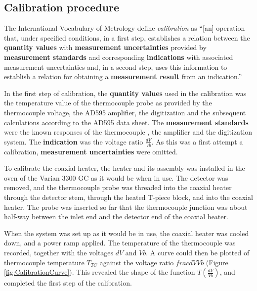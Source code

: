 \subsection{Calibration procedure}

The International Vocabulary of Metrology \autocite{JCGM200:2012} define
\textit{calibration} as ``[an] operation that, under specified conditions, in a
first step, establishes a relation between the \textbf{quantity values} with
\textbf{measurement uncertainties} provided by \textbf{measurement standards}
and corresponding \textbf{indications} with associated measurement uncertainties
and, in a second step, uses this information to establish a relation for
obtaining a \textbf{measurement result} from an indication.''

In the first step of calibration, the \textbf{quantity values} used in the calibration was the temperature value
of the thermocouple probe as provided by the thermocouple voltage, the AD595
amplifier, the digitization and the subsequent calculations according to the
AD595 data sheet. The \textbf{measurement standards} were the known responses of
the thermocouple \autocite{Ripple1995}, the amplifier and the digitization system. The
\textbf{indication} was the voltage ratio \(\frac{dV}{Vb}\). As this was a first
attempt a calibration, \textbf{measurement uncertainties} were omitted.

To calibrate the coaxial heater, the heater and its assembly was installed in
the oven of the Varian 3300 GC as it would be when in use. The detector was
removed, and the thermocouple probe was threaded into the coaxial heater through
the detector stem, through the heated T-piece block, and into the coaxial
heater. The probe was inserted so far that the thermocouple junction was about
half-way between the inlet end and the detector end of the coaxial heater.

When the system was set up as it would be in use, the coaxial heater was cooled
down, and a power ramp applied. The temperature of the thermocouple was
recorded, together with the voltages \(dV\) and \(Vb\). A curve could then be
plotted of thermocouple temperature \(T_{TC}\) against the voltage ratio
\(frac{dV}{Vb}\) (Figure \ref{fig:CalibrationCurve}). This revealed the shape of the function \(T(\frac{dV}{Vb})\),
and completed the first step of the calibration.

